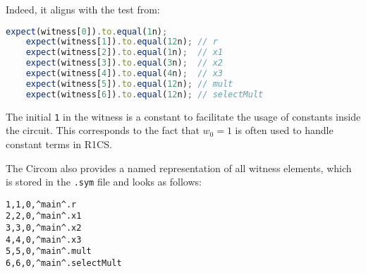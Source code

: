 \documentclass[../lecture-notes.tex]{subfiles}
\begin{document}
    Indeed, it aligns with the test from:

    \begin{center}
        \begin{tcolorbox}[enhanced,
            width=0.75\textwidth,
            title={\textbf{test/Math.witness.test.ts}},
            coltitle=gray!25!black,
            attach boxed title to top center={yshift=-2mm,yshifttext=-1mm},
            boxed title style={size=small,colframe=gray!75!black,
            colback=Green!30!white,boxrule=1pt},
            top=-0.3cm,
            bottom=-0.3cm]
            \begin{lstlisting}[language=TypeScript,numbers=none,basicstyle=\ttfamily\footnotesize]
    expect(witness[0]).to.equal(1n);
    expect(witness[1]).to.equal(12n); // r
    expect(witness[2]).to.equal(1n);  // x1
    expect(witness[3]).to.equal(3n);  // x2
    expect(witness[4]).to.equal(4n);  // x3
    expect(witness[5]).to.equal(12n); // mult
    expect(witness[6]).to.equal(12n); // selectMult
            \end{lstlisting}
        \end{tcolorbox}
    \end{center}

    The initial \texttt{1} in the witness is a constant to facilitate the usage of constants inside the circuit.
    This corresponds to the fact that $w_0=1$ is often used to handle constant terms in R1CS.

    The Circom also provides a named representation of all witness elements, which is stored in the \texttt{.sym} file and looks as follows:

    \begin{center}
        \begin{tcolorbox}[enhanced,
            width=0.5\textwidth,
            title=\textbf{.sym file for $x_1? \; x_2 \times x_3: x_2+x_3$},
            coltitle=gray!25!black,
            attach boxed title to top center={yshift=-2mm,yshifttext=-1mm},
            boxed title style={size=small,colframe=gray!75!black,
            colback=blue!30!white,boxrule=1pt},
            top=-0.35cm,
            bottom=-0.35cm]
            \begin{lstlisting}[language=Circom,numbers=none,basicstyle=\ttfamily\footnotesize,escapechar=^]
1,1,0,^main^.r
2,2,0,^main^.x1
3,3,0,^main^.x2
4,4,0,^main^.x3
5,5,0,^main^.mult
6,6,0,^main^.selectMult
            \end{lstlisting}
        \end{tcolorbox}
    \end{center}
\end{document}
